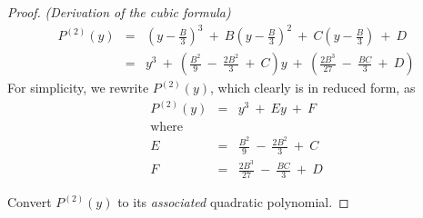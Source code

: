 \begin{proof} {\it (Derivation of the cubic formula)}
\begin{eqnarray}
\nonumber
P^{(2)}(y) & = &  \left(y - \frac{B}{3} \right)^3
 \ + \ B \left(y - \frac{B}{3} \right)^2
 \ + \ C \left(y - \frac{B}{3} \right) \ + \ D \\
\label{eq:generic-cubic-3}
           & = &
y^3 \ + \
\left( \frac{B^2}{9} \ - \ \frac{2B^2}{3} \ + \ C  \right) y
\ + \ \left( \frac{2 B^3}{27}  \ - \ \frac{BC}{3}  \ + \ D \right)
\end{eqnarray}
For simplicity, we rewrite $P^{(2)}(y)$, which clearly is in reduced
form, as
\begin{eqnarray}
\label{eq:generic-cubic-4}
P^{(2)}(y) & = & y^3 \ + \ E y \ + \ F \\
\nonumber
\mbox{where} & & \\
\nonumber
E & = & \frac{B^2}{9} \ - \ \frac{2B^2}{3} \ + \ C \\
\nonumber
F & = & \frac{2 B^3}{27}  \ - \ \frac{BC}{3}  \ + \ D
\end{eqnarray}


\medskip

 Convert $P^{(2)}(y)$ to its {\em associated}
quadratic polynomial.


\end{proof}
